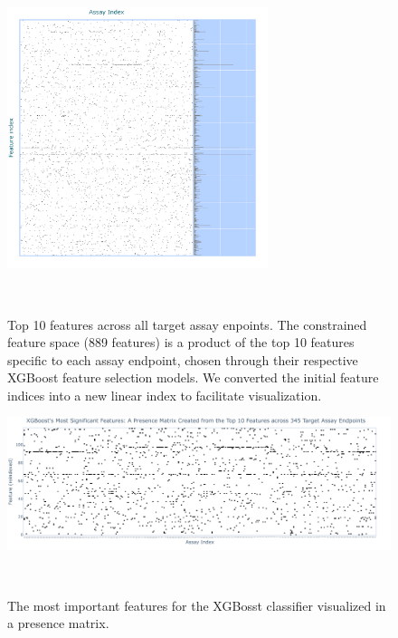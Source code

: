 \begin{figure}[h]
  \centering
  \includegraphics[width=0.68\textwidth]{figures/feature_importance.png}  
  \caption{Top 10 features across all target assay enpoints. The constrained feature space (889 features) is a product of the top 10 features specific to each assay endpoint, chosen through their respective XGBoost feature selection models. We converted the initial feature indices into a new linear index to facilitate visualization.}
~\label{fig:feature_importance} 
\end{figure}


\begin{figure}[h]
  \centering
  \includegraphics[width=1.0\textwidth]{figures/Feature_Selection_XGBClassifier__Feature_Selection_XGBClassifier_feature_importance.png}  
  \caption{The most important features for the XGBosst classifier visualized in a presence matrix.}
~\label{fig:Feature_Selection_XGBClassifier__Feature_Selection_XGBClassifier_feature_importance} 
\end{figure}

